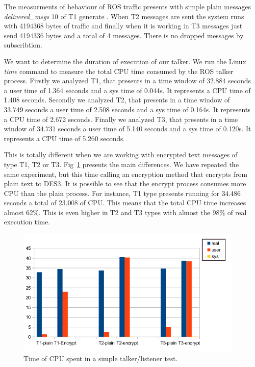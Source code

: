 \documentclass[journal,twoside]{JoPhA}
\begin{document}
The measurments of behaviour of ROS traffic presents with simple plain messages {\em delivered\_msgs} 10 of T1 generate . When T2 messages are sent the system runs with 4194368 bytes of traffic and finally when it is working in  T3 messages just send 4194336 bytes and a total of 4 messages. There is no dropped messages by subscribtion.

We want to determine the duration of execution of our talker. We run the Linux {\em time} command to measure the total CPU time consumed by the ROS talker process. 
Firstly we analyzed T1, that presents in a time window of 32.884 seconds a user time of  1.364 seconds and a sys time of 0.044s. It represents a CPU time of 1.408 seconds.
Secondly we analyzed T2, that presents in a time window of 33.749 seconds a user time of  2.508 seconds and a sys time of 0.164s. It represents a CPU time of 2.672 seconds.
Finally we analyzed T3, that presents in a time window of 34.731 seconds a user time of  5.140 seconds and a sys time of 0.120s. It represents a CPU time of 5.260 seconds.

This is totally different when we are working with encrypted text messages of type T1, T2 or T3. Fig~\ref{fig:time_text_CPU} presents the main differences. We have repeated the same experiment, but this time calling an encryption method that encrypts from plain text to DES3. It is possible to see that the encrypt process consumes more CPU than  the plain process.
For instance, T1 type presents running for  34.486 seconds a total of 23.008 of CPU. This means that the total CPU time increases almost 62\%. This is even higher in T2 and T3 types with almost the 98\% of real execution time.
\begin{figure}[h!]
    \centering
    \includegraphics[width=.5\textwidth]{Tiempos_CPU_cifrado_texto.png}
    \caption{Time of CPU spent in a simple talker/listener test.}
  \label{fig:time_text_CPU}
\end{figure}
\end{document}
